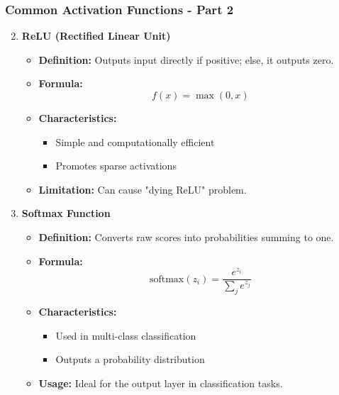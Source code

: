 \documentclass[aspectratio=169]{beamer}
\begin{document}
\begin{frame}[fragile]
    \frametitle{Common Activation Functions - Part 2}
    \begin{enumerate}
        \setcounter{enumi}{1} %
        \item \textbf{ReLU (Rectified Linear Unit)}
        \begin{itemize}
            \item \textbf{Definition:} Outputs input directly if positive; else, it outputs zero.
            \item \textbf{Formula:} 
            \begin{equation}
                f(x) = \max(0, x)
            \end{equation}
            \item \textbf{Characteristics:}
            \begin{itemize}
                \item Simple and computationally efficient
                \item Promotes sparse activations
            \end{itemize}
            \item \textbf{Limitation:} Can cause "dying ReLU" problem.
        \end{itemize}

        \item \textbf{Softmax Function}
        \begin{itemize}
            \item \textbf{Definition:} Converts raw scores into probabilities summing to one.
            \item \textbf{Formula:} 
            \begin{equation}
                \text{softmax}(z_i) = \frac{e^{z_i}}{\sum_{j} e^{z_j}}
            \end{equation}
            \item \textbf{Characteristics:}
            \begin{itemize}
                \item Used in multi-class classification
                \item Outputs a probability distribution
            \end{itemize}
            \item \textbf{Usage:} Ideal for the output layer in classification tasks.
        \end{itemize}
    \end{enumerate}
\end{frame}
\end{document}
